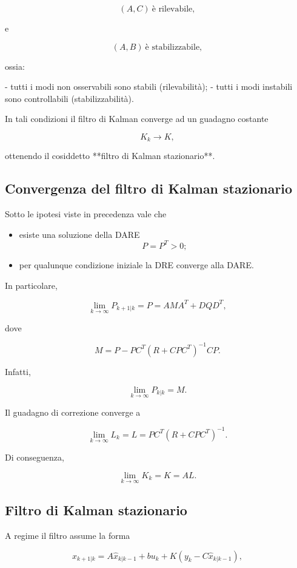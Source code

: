 \documentclass[11pt,a4paper]{article}
\begin{document}
\[
\boxed{
(A,C)
\ \text{è rilevabile},
}
\]

e

\[
\boxed{
(A,B)
\ \text{è stabilizzabile},
}
\]

ossia:

- tutti i modi non osservabili sono stabili (rilevabilità);
- tutti i modi instabili sono controllabili (stabilizzabilità).

In tali condizioni il filtro di Kalman converge ad un guadagno costante

\[
K_k\longrightarrow K,
\]

ottenendo il cosiddetto **filtro di Kalman stazionario**.

\subsection*{Convergenza del filtro di Kalman stazionario}

Sotto le ipotesi viste in precedenza vale che

\begin{itemize}
    \item esiste una soluzione della DARE
    \[
    P=P^T>0;
    \]
    \item per qualunque condizione iniziale la DRE converge alla DARE.
\end{itemize}

In particolare,

\[
\boxed{
\lim_{k\rightarrow\infty}
P_{k+1|k}
=
P
=
AMA^T
+
DQD^T,
}
\]

dove

\[
\boxed{
M
=
P
-
PC^T
(R+CPC^T)^{-1}
CP.
}
\]

Infatti,

\[
\boxed{
\lim_{k\rightarrow\infty}
P_{k|k}
=
M.
}
\]

Il guadagno di correzione converge a

\[
\boxed{
\lim_{k\rightarrow\infty}
L_k
=
L
=
PC^T
(R+CPC^T)^{-1}.
}
\]

Di conseguenza,

\[
\boxed{
\lim_{k\rightarrow\infty}
K_k
=
K
=
AL.
}
\]

\subsection*{Filtro di Kalman stazionario}

A regime il filtro assume la forma

\[
\boxed{
\hat{x}_{k+1|k}
=
A\hat{x}_{k|k-1}
+
bu_k
+
K
\left(
y_k-C\hat{x}_{k|k-1}
\right),
}
\]
\end{document}
